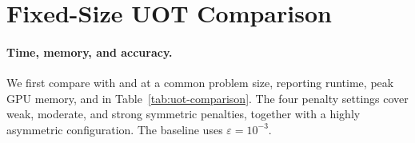 \section{Fixed-Size UOT Comparison}
\label{app:uot-fixed-size}

\paragraph{Time, memory, and accuracy.}
We first compare \ours with \mm and \sinkhorn at a common problem size, reporting runtime, peak GPU memory, and \sharedgap in Table~\ref{tab:uot-comparison}.
The four penalty settings cover weak, moderate, and strong symmetric penalties, together with a highly asymmetric configuration.
The \sinkhorn baseline uses $\varepsilon=10^{-3}$.

